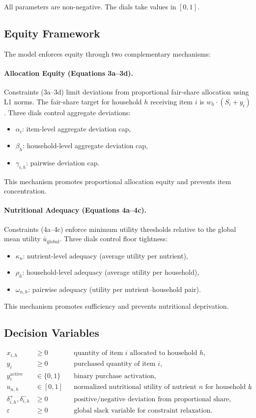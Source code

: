 \documentclass[preprint,12pt]{elsarticle}
\begin{document}
All parameters are non-negative. The dials take values in $[0,1]$.

\subsection{Equity Framework}

The model enforces equity through two complementary mechanisms:

\paragraph{Allocation Equity (Equations 3a--3d).}
Constraints (3a--3d) limit deviations from proportional fair-share allocation using L1 norms. The fair-share target for household $h$ receiving item $i$ is $w_h \cdot (S_i + y_i)$. Three dials control aggregate deviations:
\begin{itemize}
    \item $\alpha_i$: item-level aggregate deviation cap,
    \item $\beta_h$: household-level aggregate deviation cap,
    \item $\gamma_{i,h}$: pairwise deviation cap.
\end{itemize}
This mechanism promotes proportional allocation equity and prevents item concentration.

\paragraph{Nutritional Adequacy (Equations 4a--4c).}
Constraints (4a--4c) enforce minimum utility thresholds relative to the global mean utility $\bar{u}_{\text{global}}$. Three dials control floor tightness:
\begin{itemize}
    \item $\kappa_n$: nutrient-level adequacy (average utility per nutrient),
    \item $\rho_h$: household-level adequacy (average utility per household),
    \item $\omega_{n,h}$: pairwise adequacy (utility per nutrient--household pair).
\end{itemize}
This mechanism promotes sufficiency and prevents nutritional deprivation.

\subsection{Decision Variables}
\begin{align*}
x_{i,h} &\ge 0 && \text{quantity of item $i$ allocated to household $h$},\\
y_i &\ge 0 && \text{purchased quantity of item $i$},\\
y_i^{\mathrm{active}} &\in \{0,1\} && \text{binary purchase activation},\\
u_{n,h} &\in [0,1] && \text{normalized nutritional utility of nutrient $n$ for household $h$},\\
\delta_{i,h}^{+},\delta_{i,h}^{-} &\ge 0 && \text{positive/negative deviation from proportional share},\\
\varepsilon &\ge 0 && \text{global slack variable for constraint relaxation.}
\end{align*}
\end{document}
